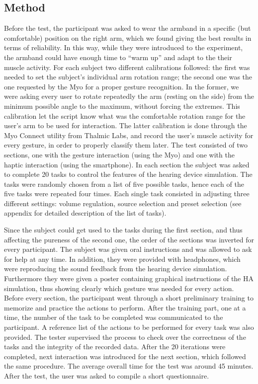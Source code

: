 \documentclass[journal]{./IEEEtran}
\begin{document}
\subsection{Method}
Before the test, the participant was asked to wear the armband in a specific (but comfortable) position on the right arm, which we found giving the best results in terms of reliability. In this way, while they were introduced to the experiment, the armband could have enough time to “warm up” and adapt to the their muscle activity. For each subject two different calibrations followed: the first was needed to set the subject’s individual arm rotation range; the second one was the one requested by the Myo for a proper gesture recognition. In the former, we were asking every user to rotate repeatedly the arm (resting on the side) from the minimum possible angle to the maximum, without forcing the extremes. This calibration let the script know what was the comfortable rotation range for the user’s arm to be used for interaction. The latter calibration is done through the Myo Connect utility from Thalmic Labs, and record the user’s muscle activity for every gesture, in order to properly classify them later.
The test consisted of two sections, one with the gesture interaction (using the Myo) and one with the haptic interaction (using the smartphone). In each section the subject was asked to complete 20 tasks to control the features of the hearing device simulation. The tasks were randomly chosen from a list of five possible tasks, hence each of the five tasks were repeated four times. Each single task consisted in adjusting three different settings: volume regulation, source selection and preset selection (see appendix for detailed description of the list of tasks). 

Since the subject could get used to the tasks during the first section, and thus affecting the pureness of the second one, the order of the sections was inverted for every participant.
The subject was given oral instructions and was allowed to ask for help at any time. In addition, they were provided with headphones, which were reproducing the sound feedback from the hearing device simulation. Furthermore they were given a poster containing graphical instructions of the HA simulation, thus showing clearly which gesture was needed for every action.
Before every section, the participant went through a short preliminary training to memorize and practice the actions to perform. After the training part, one at a time, the number of the task to be completed was communicated to the participant. A reference list of the actions to be performed for every task was also provided. The tester supervised the process to check over the correctness of the tasks and the integrity of the recorded data. After the 20 iterations were completed, next interaction was introduced for the next section, which followed the same procedure. The average overall time for the test was around 45 minutes. After the test, the user was asked to compile a short questionnaire.
\end{document}
